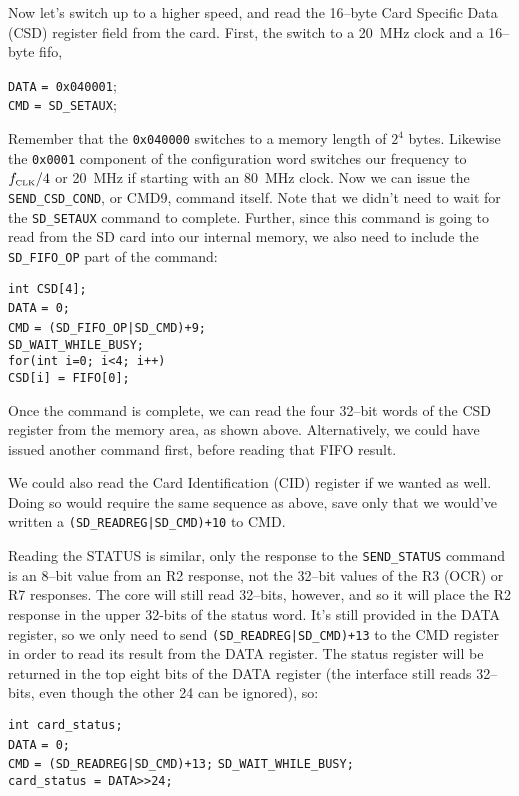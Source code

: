 \documentclass{gqtekspec}
\begin{document}
Now let's switch up to a higher speed, and read the 16--byte Card Specific
Data (CSD) register field from the card.  First, the switch to a 20~MHz clock
and a 16--byte fifo,
\begin{tabbing}
{\tt DATA} \= {\tt = 0x040001}; \\
{\tt CMD} \> {\tt = SD\_SETAUX};
\end{tabbing}
Remember that the {\tt 0x040000} switches to a memory length of $2^4$ bytes.
Likewise the {\tt 0x0001} component of the configuration word switches
our frequency to $f_{\mbox{\tiny CLK}}/4$ or 20~MHz if starting with an
$80$~MHz clock.  Now we can issue the {\tt SEND\_CSD\_COND}, or
CMD9, command itself.  Note that we didn't need to wait for the
{\tt SD\_SETAUX} command to complete.  Further, since this command is going
to read from the SD card into our internal memory, we also need to include
the {\tt SD\_FIFO\_OP} part of the command:
\begin{tabbing}
{\tt int CSD[4];}\\
{\tt DATA} \= {\tt = 0;} \\
{\tt CMD} \> {\tt = (SD\_FIFO\_OP|SD\_CMD)+9;} \\
{\tt SD\_WAIT\_WHILE\_BUSY;} \\
{\tt for(int i=0; i<4; i++) } \\
\> {\tt CSD[i] = FIFO[0];}
\end{tabbing}
Once the command is complete, we can read the four 32--bit words of the CSD
register from the memory area, as shown above.  Alternatively, we could have
issued another command first, before reading that FIFO result.

We could also read the Card Identification (CID) register if we wanted as well.
Doing so would require the same sequence as above, save only that we would've
written a 
{\tt (SD\_READREG|SD\_CMD)+10} to CMD.

Reading the STATUS is similar, only the response to the {\tt SEND\_STATUS}
command is an 8--bit value from an R2 response, not the 32--bit values of
the R3 (OCR) or R7 responses.  The core will still read 32--bits, however,
and so it will place the R2 response in the upper 32-bits of the status word.
It's still provided in the DATA register, so we only need to send
{\tt (SD\_READREG|SD\_CMD)+13} to
the CMD register in order to read its result from the DATA register.  The status
register will be returned in the top eight bits of the DATA register (the
interface still reads 32--bits, even though the other 24 can be ignored), so:
\begin{tabbing}
{\tt int card\_status;}\\
{\tt DATA} \= {\tt = 0;} \\
{\tt CMD} \> {\tt = (SD\_READREG|SD\_CMD)+13;}
{\tt SD\_WAIT\_WHILE\_BUSY;} \\
{\tt card\_status = DATA>>24;}
\end{tabbing}
\end{document}
